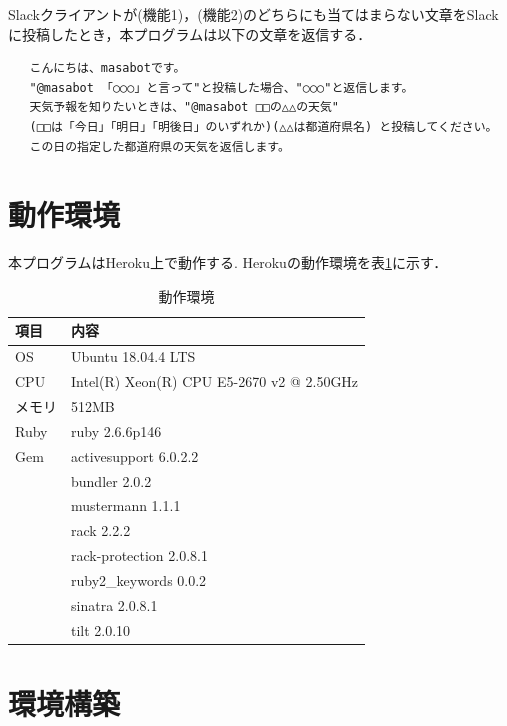 \documentclass[12pt]{jsarticle}
\begin{document}
Slackクライアントが(機能1)，(機能2)のどちらにも当てはまらない文章をSlackに投稿したとき，本プログラムは以下の文章を返信する．
\begin{verbatim}
   こんにちは、masabotです。        
   "@masabot 「○○○」と言って"と投稿した場合、"○○○"と返信します。
   天気予報を知りたいときは、"@masabot □□の△△の天気" 
   (□□は「今日」「明日」「明後日」のいずれか)(△△は都道府県名) と投稿してください。
   この日の指定した都道府県の天気を返信します。
\end{verbatim}

\section{動作環境}\label{sec:environment}
本プログラムはHeroku上で動作する.
Herokuの動作環境を表\ref{tab:2}に示す．
\begin{table}[t]
  \begin{center}
    \caption{動作環境}\label{tab:2}
    \begin{tabular}{l|l}
      \hline\hline
      \multicolumn{1}{l|}{項目} & \multicolumn{1}{l}{内容}\\
      \hline
      OS & Ubuntu 18.04.4 LTS\\
      CPU & Intel(R) Xeon(R) CPU E5-2670 v2 @ 2.50GHz\\
      メモリ & 512MB\\
      Ruby & ruby 2.6.6p146\\
      Gem & activesupport 6.0.2.2\\
     & bundler 2.0.2\\
     & mustermann 1.1.1\\
     & rack 2.2.2\\
     & rack-protection 2.0.8.1\\
     & ruby2\_keywords 0.0.2\\ 
     & sinatra 2.0.8.1\\
     & tilt 2.0.10\\
      \hline
    \end{tabular}
  \end{center}
\end{table}

\section{環境構築}
\end{document}
